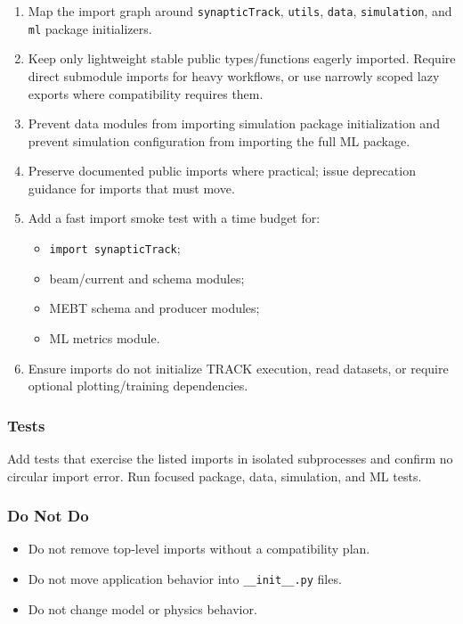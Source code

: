 \documentclass[
]{article}
\providecommand{\tightlist}{%
  \setlength{\itemsep}{0pt}\setlength{\parskip}{0pt}}
\begin{document}
\begin{enumerate}
\def\labelenumi{\arabic{enumi}.}
\tightlist
\item
  Map the import graph around \texttt{synapticTrack}, \texttt{utils},
  \texttt{data}, \texttt{simulation}, and \texttt{ml} package
  initializers.
\item
  Keep only lightweight stable public types/functions eagerly imported.
  Require direct submodule imports for heavy workflows, or use narrowly
  scoped lazy exports where compatibility requires them.
\item
  Prevent data modules from importing simulation package initialization
  and prevent simulation configuration from importing the full ML
  package.
\item
  Preserve documented public imports where practical; issue deprecation
  guidance for imports that must move.
\item
  Add a fast import smoke test with a time budget for:

  \begin{itemize}
  \tightlist
  \item
    \texttt{import\ synapticTrack};
  \item
    beam/current and schema modules;
  \item
    MEBT schema and producer modules;
  \item
    ML metrics module.
  \end{itemize}
\item
  Ensure imports do not initialize TRACK execution, read datasets, or
  require optional plotting/training dependencies.
\end{enumerate}

\hypertarget{tests-12}{%
\subsubsection{Tests}\label{tests-12}}

Add tests that exercise the listed imports in isolated subprocesses and
confirm no circular import error. Run focused package, data, simulation,
and ML tests.

\hypertarget{do-not-do-3}{%
\subsubsection{Do Not Do}\label{do-not-do-3}}

\begin{itemize}
\tightlist
\item
  Do not remove top-level imports without a compatibility plan.
\item
  Do not move application behavior into \texttt{\_\_init\_\_.py} files.
\item
  Do not change model or physics behavior.
\end{itemize}
\end{document}
